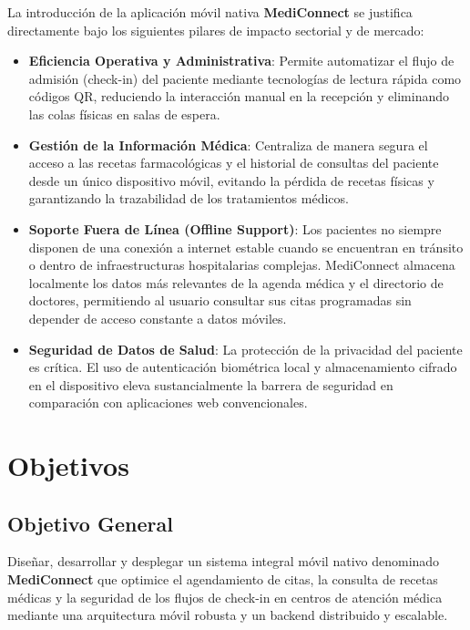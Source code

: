 \documentclass[12pt,a4paper]{report}
\begin{document}
La introducción de la aplicación móvil nativa \textbf{MediConnect} se justifica directamente bajo los siguientes pilares de impacto sectorial y de mercado:

\begin{itemize}
    \item \textbf{Eficiencia Operativa y Administrativa}: Permite automatizar el flujo de admisión (check-in) del paciente mediante tecnologías de lectura rápida como códigos QR, reduciendo la interacción manual en la recepción y eliminando las colas físicas en salas de espera.
    \item \textbf{Gestión de la Información Médica}: Centraliza de manera segura el acceso a las recetas farmacológicas y el historial de consultas del paciente desde un único dispositivo móvil, evitando la pérdida de recetas físicas y garantizando la trazabilidad de los tratamientos médicos.
    \item \textbf{Soporte Fuera de Línea (Offline Support)}: Los pacientes no siempre disponen de una conexión a internet estable cuando se encuentran en tránsito o dentro de infraestructuras hospitalarias complejas. MediConnect almacena localmente los datos más relevantes de la agenda médica y el directorio de doctores, permitiendo al usuario consultar sus citas programadas sin depender de acceso constante a datos móviles.
    \item \textbf{Seguridad de Datos de Salud}: La protección de la privacidad del paciente es crítica. El uso de autenticación biométrica local y almacenamiento cifrado en el dispositivo eleva sustancialmente la barrera de seguridad en comparación con aplicaciones web convencionales.
\end{itemize}

\section{Objetivos}

\subsection{Objetivo General}
Diseñar, desarrollar y desplegar un sistema integral móvil nativo denominado \textbf{MediConnect} que optimice el agendamiento de citas, la consulta de recetas médicas y la seguridad de los flujos de check-in en centros de atención médica mediante una arquitectura móvil robusta y un backend distribuido y escalable.
\end{document}

